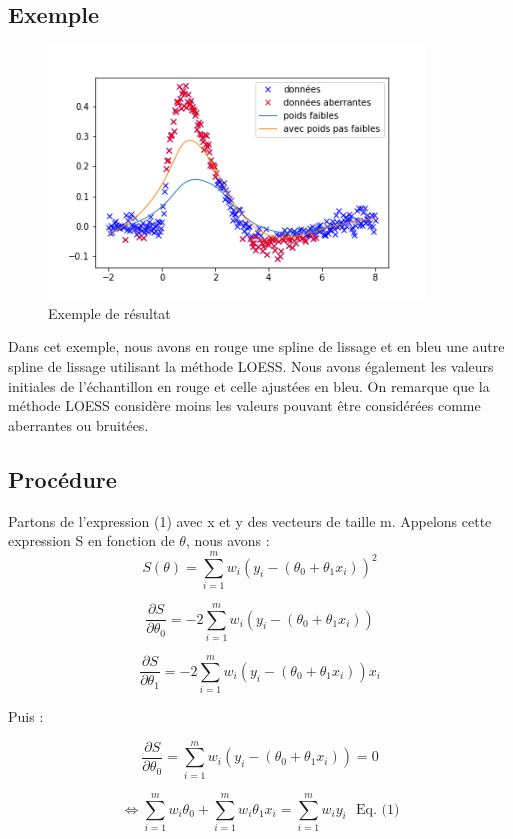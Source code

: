 \documentclass[a4paper,12pt]{article} %
\begin{document}
\subsection{Exemple}

\begin{figure}[htp]
    \centering
    \includegraphics[width=10cm]{IMG_Tache5b_nonunif}
    \caption{Exemple de résultat }
    \label{fig:exemple}
\end{figure}

Dans cet exemple, nous avons en rouge une spline de lissage et en bleu une autre spline de lissage utilisant la méthode LOESS.  Nous avons également les valeurs initiales de l'échantillon en rouge et celle ajustées en bleu. On remarque que la méthode LOESS considère moins les valeurs pouvant être considérées comme aberrantes ou bruitées.



\subsection{Procédure}

Partons de l'expression (1) avec  x et y  des vecteurs de taille m. Appelons cette expression S en fonction de $\theta$, nous avons :
\[S(\theta) = \sum_{i=1}^m w_i \left( y_i - (\theta_0 + \theta_1 x_i) \right)^2\]

\[\frac{\partial S}{\partial \theta_0} = -2 \sum_{i=1}^m w_i \left( y_i - (\theta_0 + \theta_1 x_i) \right) \]

\[ \frac{\partial S}{\partial \theta_1} = -2 \sum_{i=1}^m w_i \left( y_i - (\theta_0 + \theta_1 x_i) \right) x_i \]


Puis :

\[\frac{\partial S}{\partial \theta_0} = \sum_{i=1}^m w_i \left( y_i - (\theta_0 + \theta_1 x_i) \right)  = 0\]

\[ \iff \sum_{i=1}^m w_i  \theta_0 + \sum_{i=1}^m w_i  \theta_1 x_i  = \sum_{i=1}^m w_i y_i  \ \ \ \text{Eq. (1)}\]
\end{document}
